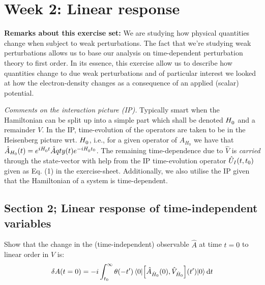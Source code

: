 \section{Week 2: Linear response}
\textbf{Remarks about this exercise set:}
We are studying how physical quantities change when subject to weak perturbations. The fact that we're studying weak perturbations allows us to base our analysis on time-dependent perturbation theory to first order. In its essence, this exercise allow us to describe how quantities change to due weak perturbations and of particular interest we looked at how the electron-density changes as a consequence of an applied (scalar) potential.

\textit{Comments on the interaction picture (IP).} Typically smart when the Hamiltonian can be split up into a simple part which shall be denoted $H^{{}}_0$ and a remainder $V$. In the IP, time-evolution of the operators are taken to be in the Heisenberg picture wrt. $H^{{}}_0$, i.e., for a given operator of $\hat{A}_{H_{0}}$ we have that $\hat{A}_{H_{0}}\qty(t) = e^{iH^{{}}_0 t} \hat{A}qty(t)e^{-iH^{{}}_0 t_0}$. The remaining time-dependence due to $\hat{V}$ is \textit{carried} through the state-vector with help from the IP time-evolution operator $\hat{U}_I\qty(t, t_0)$ given as Eq. (1) in the exercise-sheet. Additionally, we also utilise the IP given that the Hamiltonian of a system is time-dependent. 

\subsection{Section 2; Linear response of time-independent variables}
\begin{exercise}
Show that the change in the (time-independent) observable $\hat{A}$ at time $t = 0$ to linear order in $\hat{V}$ is:
\begin{equation}
    \delta A(t=0) = -i\int_{t_0}^{\infty}\theta(-t')\expval{\comm{\hat{A}_{\hat{H}_0}(0)}{\hat{V}_{\hat{H}_0}}(t')}{0}\mathrm{d}t
\end{equation}
\end{exercise}

